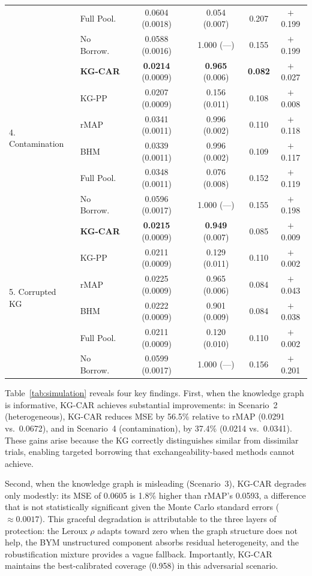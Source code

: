 \documentclass[12pt]{article}
\begin{document}
\begin{table}[ht]
\begin{tabular}{llcccc}
& Full Pool. & 0.0604 (0.0018) & 0.054 (0.007) & 0.207 & $+$0.199 \\
& No Borrow. & 0.0588 (0.0016) & 1.000 (---) & 0.155 & $+$0.199 \\
\midrule
\multirow{6}{*}{4. Contamination}
& \textbf{KG-CAR} & \textbf{0.0214} (0.0009) & \textbf{0.965} (0.006) & \textbf{0.082} & $+$0.027 \\
& KG-PP & 0.0207 (0.0009) & 0.156 (0.011) & 0.108 & $+$0.008 \\
& rMAP & 0.0341 (0.0011) & 0.996 (0.002) & 0.110 & $+$0.118 \\
& BHM & 0.0339 (0.0011) & 0.996 (0.002) & 0.109 & $+$0.117 \\
& Full Pool. & 0.0348 (0.0011) & 0.076 (0.008) & 0.152 & $+$0.119 \\
& No Borrow. & 0.0596 (0.0017) & 1.000 (---) & 0.155 & $+$0.198 \\
\midrule
\multirow{6}{*}{5. Corrupted KG}
& \textbf{KG-CAR} & \textbf{0.0215} (0.0009) & \textbf{0.949} (0.007) & 0.085 & $+$0.009 \\
& KG-PP & 0.0211 (0.0009) & 0.129 (0.011) & 0.110 & $+$0.002 \\
& rMAP & 0.0225 (0.0009) & 0.965 (0.006) & 0.084 & $+$0.043 \\
& BHM & 0.0222 (0.0009) & 0.901 (0.009) & 0.084 & $+$0.038 \\
& Full Pool. & 0.0211 (0.0009) & 0.120 (0.010) & 0.110 & $+$0.002 \\
& No Borrow. & 0.0599 (0.0017) & 1.000 (---) & 0.156 & $+$0.201 \\
\bottomrule
\end{tabular}
\end{table}

Table~\ref{tab:simulation} reveals four key findings. First, when the knowledge graph is informative, KG-CAR achieves substantial improvements: in Scenario~2 (heterogeneous), KG-CAR reduces MSE by 56.5\% relative to rMAP (0.0291 vs.\ 0.0672), and in Scenario~4 (contamination), by 37.4\% (0.0214 vs.\ 0.0341). These gains arise because the KG correctly distinguishes similar from dissimilar trials, enabling targeted borrowing that exchangeability-based methods cannot achieve.

Second, when the knowledge graph is misleading (Scenario~3), KG-CAR degrades only modestly: its MSE of 0.0605 is 1.8\% higher than rMAP's 0.0593, a difference that is not statistically significant given the Monte Carlo standard errors ($\approx 0.0017$). This graceful degradation is attributable to the three layers of protection: the Leroux $\rho$ adapts toward zero when the graph structure does not help, the BYM unstructured component absorbs residual heterogeneity, and the robustification mixture provides a vague fallback. Importantly, KG-CAR maintains the best-calibrated coverage (0.958) in this adversarial scenario.
\end{document}
